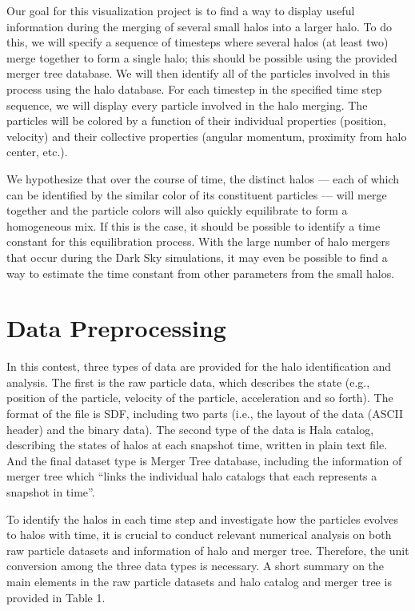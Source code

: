 \documentclass[12pt]{article}
\begin{document}
Our goal for this visualization project is to find a way to display useful
information during the merging of several small halos into a larger halo. To do
this, we will specify a sequence of timesteps where several halos (at least
two) merge together to form a single halo; this should be possible using the
provided merger tree database. We will then identify all of the particles
involved in this process using the halo database. For each timestep in the
specified time step sequence, we will display every particle involved in the
halo merging. The particles will be colored by a function of their individual
properties (position, velocity) and their collective properties (angular
momentum, proximity from halo center, etc.).

We hypothesize that over the course of time, the distinct halos --- each of
which can be identified by the similar color of its constituent particles ---
will merge together and the particle colors will also quickly equilibrate to
form a homogeneous mix. If this is the case, it should be possible to identify
a time constant for this equilibration process. With the large number of halo
mergers that occur during the Dark Sky simulations, it may even be possible to
find a way to estimate the time constant from other parameters from the small
halos.


\section{Data Preprocessing}
In this contest, three types of data are provided for the halo identification
and analysis. The first is the raw particle data, which describes the state
(e.g., position of the particle, velocity of the particle, acceleration and so
forth).  The format of the file is SDF, including two parts (i.e., the layout
of the data (ASCII header) and the binary data). The second type of the data is
Hala catalog, describing the states of halos at each snapshot time, written in
plain text file.  And the final dataset type is Merger Tree database, including
the information of merger tree which ``links the individual halo catalogs that
each represents a snapshot in time''.

To identify the halos in each time step and investigate how the particles evolves to 
halos with time, it is crucial to conduct relevant numerical analysis on both raw 
particle datasets and information of halo and merger tree. Therefore, the unit conversion 
among the three data types is necessary. A short summary on the main elements in the 
raw particle datasets and halo catalog and merger tree is provided in Table 1.
\end{document}

